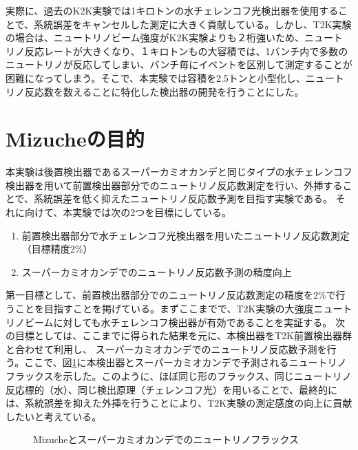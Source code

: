 \documentclass[11pt]{jreport}
\newcommand{\figref}[1]{図\ref{#1}}
\begin{document}
実際に、過去のK2K実験では1キロトンの水チェレンコフ光検出器を使用することで、系統誤差をキャンセルした測定に大きく貢献している。しかし、T2K実験の場合は、ニュートリノビーム強度がK2K実験よりも２桁強いため、ニュートリノ反応レートが大きくなり、１キロトンもの大容積では、1バンチ内で多数のニュートリノが反応してしまい、バンチ毎にイベントを区別して測定することが困難になってしまう。そこで、本実験では容積を2.5トンと小型化し、ニュートリノ反応数を数えることに特化した検出器の開発を行うことにした。

\section{Mizucheの目的}

本実験は後置検出器であるスーパーカミオカンデと同じタイプの水チェレンコフ検出器を用いて前置検出器部分でのニュートリノ反応数測定を行い、外挿することで、系統誤差を低く抑えたニュートリノ反応数予測を目指す実験である。
それに向けて、本実験では次の2つを目標にしている。
\begin{enumerate}
\item 前置検出器部分で水チェレンコフ光検出器を用いたニュートリノ反応数測定\\（目標精度2\%）
\item スーパーカミオカンデでのニュートリノ反応数予測の精度向上
\end{enumerate}

第一目標として、前置検出器部分でのニュートリノ反応数測定の精度を2\%で行うことを目指すことを掲げている。まずここまでで、T2K実験の大強度ニュートリノビームに対しても水チェレンコフ検出器が有効であることを実証する。
次の目標としては、ここまでに得られた結果を元に、本検出器をT2K前置検出器群と合わせて利用し、
スーパーカミオカンデでのニュートリノ反応数予測を行う。ここで、\figref{MizuSKFlux}に本検出器とスーパーカミオカンデで予測されるニュートリノフラックスを示した。このように、ほぼ同じ形のフラックス、同じニュートリノ反応標的（水）、同じ検出原理（チェレンコフ光）を用いることで、最終的には、系統誤差を抑えた外挿を行うことにより、T2K実験の測定感度の向上に貢献したいと考えている。

\begin{figure}[htbp]
  \begin{minipage}{0.47\textwidth}
  \end{minipage}
  \hfill
  \begin{minipage}{0.47\textwidth}
  \end{minipage}
    \caption[Mizucheとスーパーカミオカンデでのニュートリノフラックス]{Mizucheとスーパーカミオカンデでのニュートリノフラックス}
  \label{MizuSKFlux}
\end{figure}
\end{document}
